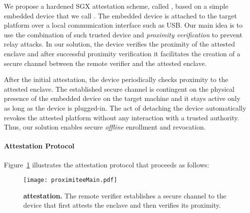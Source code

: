 We propose a hardened SGX attestation scheme, called \namepm, based on a simple embedded device that we call \key. The embedded device is attached to the target platform over a local communication interface such as USB. 
Our main idea is to use the combination of such trusted device and \emph{proximity verification} to prevent relay attacks. In our solution, the \key device verifies the proximity of the attested enclave and after successful proximity verification it facilitates the creation of a secure channel between the remote verifier and the attested enclave. 

After the initial attestation, the device periodically checks proximity to the attested enclave. The established secure channel is contingent on the physical presence of the embedded device on the target machine and it stays active only as long as the device is plugged-in. The act of detaching the device automatically revokes the attested platform without any interaction with a trusted authority. Thus, our solution enables secure \emph{offline} enrollment and revocation. 


\paragraph{Attestation Protocol} Figure~\ref{fig:systemSetUp} illustrates the \namepm attestation protocol that proceeds as follows:


\begin{figure}[t]
 \centering
  \texttt{[image: proximiteeMain.pdf]}
 \caption{\textbf{\namepm attestation.} The remote verifier establishes a secure channel to the \key device that first attests the enclave and then verifies its proximity.}
 \label{fig:systemSetUp}
\end{figure}

